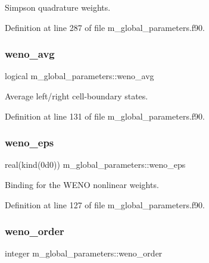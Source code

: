 Simpson quadrature weights. 



Definition at line 287 of file m\+\_\+global\+\_\+parameters.\+f90.

\mbox{\label{namespacem__global__parameters_a1b38593c502f05d17607529d38c97a82}} 
\subsubsection{\texorpdfstring{weno\+\_\+avg}{weno\_avg}}
{\footnotesize\ttfamily logical m\+\_\+global\+\_\+parameters\+::weno\+\_\+avg}



Average left/right cell-\/boundary states. 



Definition at line 131 of file m\+\_\+global\+\_\+parameters.\+f90.

\mbox{\label{namespacem__global__parameters_aa25252e327df938260ddd7cc5e0a5dda}} 
\subsubsection{\texorpdfstring{weno\+\_\+eps}{weno\_eps}}
{\footnotesize\ttfamily real(kind(0d0)) m\+\_\+global\+\_\+parameters\+::weno\+\_\+eps}



Binding for the W\+E\+NO nonlinear weights. 



Definition at line 127 of file m\+\_\+global\+\_\+parameters.\+f90.

\mbox{\label{namespacem__global__parameters_ab8488205257dab4e94258eee55d0d1aa}} 
\subsubsection{\texorpdfstring{weno\+\_\+order}{weno\_order}}
{\footnotesize\ttfamily integer m\+\_\+global\+\_\+parameters\+::weno\+\_\+order}



